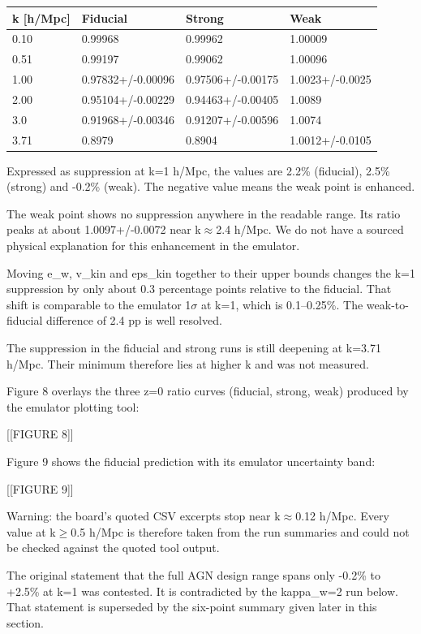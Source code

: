 \documentclass[11pt,a4paper]{article}
\begin{document}
\begin{longtable}{@{}p{}p{}p{}p{}@{}}
\toprule
\textbf{k [h/Mpc]} & \textbf{Fiducial} & \textbf{Strong} & \textbf{Weak} \\ \midrule \endhead
0.10 & 0.99968 & 0.99962 & 1.00009 \\
0.51 & 0.99197 & 0.99062 & 1.00096 \\
1.00 & 0.97832+/-0.00096 & 0.97506+/-0.00175 & 1.0023+/-0.0025 \\
2.00 & 0.95104+/-0.00229 & 0.94463+/-0.00405 & 1.0089 \\
3.0 & 0.91968+/-0.00346 & 0.91207+/-0.00596 & 1.0074 \\
3.71 & 0.8979 & 0.8904 & 1.0012+/-0.0105 \\
\bottomrule\end{longtable}
Expressed as suppression at k=1 h/Mpc, the values are 2.2\% (fiducial), 2.5\% (strong) and -0.2\% (weak). The negative value means the weak point is enhanced.

The weak point shows no suppression anywhere in the readable range. Its ratio peaks at about 1.0097+/-0.0072 near k$\approx$2.4 h/Mpc. We do not have a sourced physical explanation for this enhancement in the emulator.

Moving e\_w, v\_kin and eps\_kin together to their upper bounds changes the k=1 suppression by only about 0.3 percentage points relative to the fiducial. That shift is comparable to the emulator 1$\sigma$ at k=1, which is 0.1--0.25\%. The weak-to-fiducial difference of 2.4 pp is well resolved.

The suppression in the fiducial and strong runs is still deepening at k=3.71 h/Mpc. Their minimum therefore lies at higher k and was not measured.

Figure 8 overlays the three z=0 ratio curves (fiducial, strong, weak) produced by the emulator plotting tool:

[[FIGURE 8]]

Figure 9 shows the fiducial prediction with its emulator uncertainty band:

[[FIGURE 9]]

Warning: the board's quoted CSV excerpts stop near k$\approx$0.12 h/Mpc. Every value at k$\geq$0.5 h/Mpc is therefore taken from the run summaries and could not be checked against the quoted tool output.

The original statement that the full AGN design range spans only -0.2\% to +2.5\% at k=1 was contested. It is contradicted by the kappa\_w=2 run below. That statement is superseded by the six-point summary given later in this section.
\end{document}
